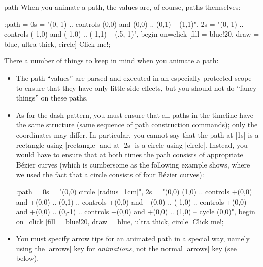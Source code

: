 \begin{tikzanimateattribute}{path}
    When you animate a path, the values are, of course, paths themselves:
\begin{codeexample}[
    preamble={\usetikzlibrary{animations}},
    animation list={0.5,1,1.5,2},
]
\tikz \node :path = {
        0s = "{(0,-1) .. controls (0,0) and (0,0)   .. (0,1) -- (1,1)}",
        2s = "{(0,-1) .. controls (-1,0) and (-1,0) .. (-1,1) -- (.5,-1)}",
        begin on=click }
  [fill = blue!20, draw = blue, ultra thick, circle] {Click me!};
\end{codeexample}
    There a number of things to keep in mind when you animate a path:
    \begin{itemize}
        \item The path ``values'' are parsed and executed in an especially
            protected scope to ensure that they have only little side effects,
            but you should not do ``fancy things'' on these paths.
        \item As for the dash pattern, you must ensure that all paths in the
            timeline have the same structure (same sequence of path
            construction commands); only the coordinates may differ. In
            particular, you cannot say that the path at |1s| is a rectangle
            using |rectangle| and at |2s| is a circle using |circle|. Instead,
            you would have to ensure that at both times the path consists of
            appropriate Bézier curves (which is cumbersome as the following
            example shows, where we used the fact that a circle consists of
            four Bézier curves):
\begin{codeexample}[
    preamble={\usetikzlibrary{animations}},
    animation list={0.5,1,1.5,2},
]
\tikz \node :path = {
        0s = "{(0,0) circle [radius=1cm]}",
        2s = "{(0,0)
               (1,0) .. controls +(0,0) and +(0,0) .. (0,1)
                     .. controls +(0,0) and +(0,0) .. (-1,0)
                     .. controls +(0,0) and +(0,0) .. (0,-1)
                     .. controls +(0,0) and +(0,0) .. (1,0)
                     -- cycle (0,0)}",
        begin on=click}
  [fill = blue!20, draw = blue, ultra thick, circle] {Click me!};
\end{codeexample}
        \item You must specify arrow tips for an animated path in a special
            way, namely using the |arrows| key for \emph{animations}, not the
            normal |arrows| key (see below).
    \end{itemize}
\end{tikzanimateattribute}

